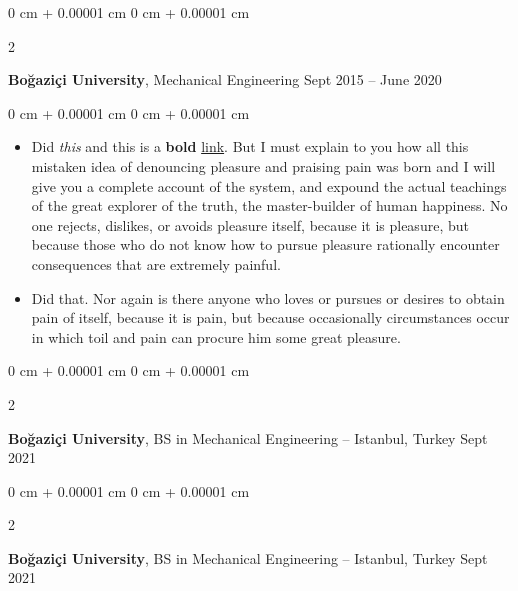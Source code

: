 \documentclass[10pt, letterpaper]{article}
\newenvironment{highlights}{
    \begin{itemize}[
        topsep=0.10 cm,
        parsep=0.10 cm,
        partopsep=0pt,
        itemsep=0pt,
        leftmargin=0 cm + 10pt
    ]
}{
    \end{itemize}
} %
\newenvironment{onecolentry}{
    \begin{adjustwidth}{
        0 cm + 0.00001 cm
    }{
        0 cm + 0.00001 cm
    }
}{
    \end{adjustwidth}
} %
\newenvironment{twocolentry}[2][]{
    \onecolentry
    \def\secondColumn{#2}
    \setcolumnwidth{\fill, 4.5 cm}
    \begin{paracol}{2}
}{
    \switchcolumn \raggedleft \secondColumn
    \end{paracol}
    \endonecolentry
} %
\begin{document}
        \vspace{0.2 cm}

        \begin{twocolentry}{
            Sept 2015 – June 2020
        }
            \textbf{Boğaziçi University}, Mechanical Engineering\end{twocolentry}

        \vspace{0.10 cm}
        \begin{onecolentry}
            \begin{highlights}
                \item Did \textit{this} and this is a \textbf{bold} \href{https://example.com}{link}. But I must explain to you how all this mistaken idea of denouncing pleasure and praising pain was born and I will give you a complete account of the system, and expound the actual teachings of the great explorer of the truth, the master-builder of human happiness. No one rejects, dislikes, or avoids pleasure itself, because it is pleasure, but because those who do not know how to pursue pleasure rationally encounter consequences that are extremely painful.
                \item Did that. Nor again is there anyone who loves or pursues or desires to obtain pain of itself, because it is pain, but because occasionally circumstances occur in which toil and pain can procure him some great pleasure.
            \end{highlights}
        \end{onecolentry}


        \vspace{0.2 cm}

        \begin{twocolentry}{
            Sept 2021
        }
            \textbf{Boğaziçi University}, BS in Mechanical Engineering -- Istanbul, Turkey\end{twocolentry}



        \vspace{0.2 cm}

        \begin{twocolentry}{
            Sept 2021
        }
            \textbf{Boğaziçi University}, BS in Mechanical Engineering -- Istanbul, Turkey\end{twocolentry}



        \vspace{0.2 cm}
\end{document}
